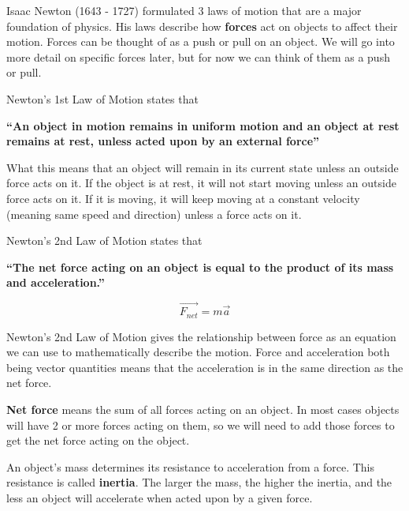 \documentclass[12pt]{book}
\begin{document}
Isaac Newton (1643 - 1727) formulated 3 laws of motion that are a major foundation of physics. His laws describe how \textbf{forces} act on objects to affect their motion. Forces can be thought of as a push or pull on an object. We will go into more detail on specific forces later, but for now we can think of them as a push or pull.

\linespace

Newton's 1st Law of Motion states that

\hspace{10pt}

\textbf{``An object in motion remains in uniform motion and an object at rest remains at rest, unless acted upon by an external force''}

\linespace

What this means that an object will remain in its current state unless an outside force acts on it. If the object is at rest, it will not start moving unless an outside force acts on it. If it is moving, it will keep moving at a constant velocity (meaning same speed and direction) unless a force acts on it.

\linespace

Newton's 2nd Law of Motion states that

\hspace{10pt}

\textbf{``The net force acting on an object is equal to the product of its mass and acceleration.''}

\begin{equation}
\overrightarrow{F_{net}} = m \overrightarrow{a}
\label{2ndlaw}
\end{equation}

\linespace

Newton's 2nd Law of Motion gives the relationship between force as an equation we can use to mathematically describe the motion. Force and acceleration both being vector quantities means that the acceleration is in the same direction as the net force.

\textbf{Net force} means the sum of all forces acting on an object. In most cases objects will have 2 or more forces acting on them, so we will need to add those forces to get the net force acting on the object.

An object's mass determines its resistance to acceleration from a force. This resistance is called \textbf{inertia}. The larger the mass, the higher the inertia, and the less an object will accelerate when acted upon by a given force.
\end{document}

